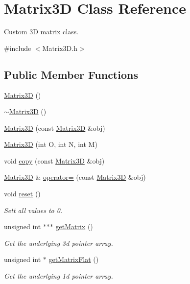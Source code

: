 \hypertarget{classMatrix3D}{\section{Matrix3\-D Class Reference}
\label{classMatrix3D}
}


Custom 3\-D matrix class.  




{\ttfamily \#include $<$Matrix3\-D.\-h$>$}

\subsection*{Public Member Functions}
\begin{DoxyCompactItemize}
\item 
\hyperlink{classMatrix3D_afe9c6b7abe858fe9f6aea8f0607a00a7}{Matrix3\-D} ()
\item 
\hyperlink{classMatrix3D_a67ebf80ff62e71d327066491811401af}{$\sim$\-Matrix3\-D} ()
\item 
\hyperlink{classMatrix3D_a51455404cc25fe88aeaaca00ed84c9ee}{Matrix3\-D} (const \hyperlink{classMatrix3D}{Matrix3\-D} \&obj)
\item 
\hyperlink{classMatrix3D_a3c37d27fa112e9d658a12e0f9316465c}{Matrix3\-D} (int O, int N, int M)
\item 
void \hyperlink{classMatrix3D_a8e59f8086014545c9903c19285e1633c}{copy} (const \hyperlink{classMatrix3D}{Matrix3\-D} \&obj)
\item 
\hyperlink{classMatrix3D}{Matrix3\-D} \& \hyperlink{classMatrix3D_a6fdf8e427536d117728ebaa553299536}{operator=} (const \hyperlink{classMatrix3D}{Matrix3\-D} \&obj)
\item 
void \hyperlink{classMatrix3D_ac33fc82014b8044fca2d2a0c66198af7}{reset} ()
\begin{DoxyCompactList}\small\item\em Sett all values to 0. \end{DoxyCompactList}\item 
unsigned int $\ast$$\ast$$\ast$ \hyperlink{classMatrix3D_add08639722074b7937673ec3c32244a0}{get\-Matrix} ()
\begin{DoxyCompactList}\small\item\em Get the underlying 3d pointer array. \end{DoxyCompactList}\item 
unsigned int $\ast$ \hyperlink{classMatrix3D_a50c9ddd36d2bb1c04c6439990f0770da}{get\-Matrix\-Flat} ()
\begin{DoxyCompactList}\small\item\em Get the underlying 1d pointer array. \end{DoxyCompactList}\item 

\end{DoxyCompactItemize}
